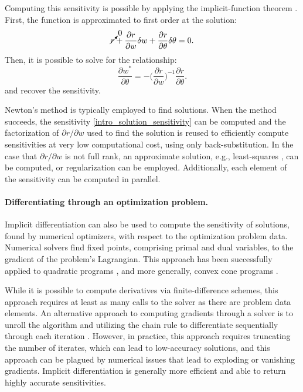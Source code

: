 Computing this sensitivity is possible by applying the implicit-function theorem \cite{dini1907lezioni}. First, the function is approximated to first order at the solution:
\begin{equation}
	\cancelto{0}{r} + \frac{\partial r}{\partial w} \delta w + \frac{\partial r}{\partial \theta} \delta \theta = 0.
\end{equation}
Then, it is possible to solve for the relationship: 
\begin{equation}
	\frac{\partial w^*}{\partial \theta} = -\Big(\frac{\partial r}{\partial w}\Big)^{-1} \frac{\partial r}{\partial \theta}. \label{intro_solution_sensitivity}
\end{equation}
and recover the sensitivity.

Newton's method is typically employed to find solutions. When the method succeeds, the sensitivity \eqref{intro_solution_sensitivity} can be computed and the factorization of $\partial r / \partial w$ used to find the solution is reused to efficiently compute sensitivities at very low computational cost, using only back-substitution. In the case that $\partial r / \partial w$ is not full rank, an approximate solution, e.g., least-squares \cite{boyd2004convex}, can be computed, or regularization can be employed. Additionally, each element of the sensitivity can be computed in parallel.

\paragraph{Differentiating through an optimization problem.}
Implicit differentiation can also be used to compute the sensitivity of solutions, found by numerical optimizers, with respect to the optimization problem data. Numerical solvers find fixed points, comprising primal and dual variables, to the gradient of the problem's Lagrangian. This approach has been successfully applied to quadratic programs \cite{amos2017optnet}, and more generally, convex cone programs \cite{agrawal2019differentiating}.

While it is possible to compute derivatives via finite-difference schemes, this approach requires at least as many calls to the solver as there are problem data elements. An alternative approach to computing gradients through a solver is to unroll the algorithm and utilizing the chain rule to differentiate sequentially through each iteration \cite{domke2012generic}. However, in practice, this approach requires truncating the number of iterates, which can lead to low-accuracy solutions, and this approach can be plagued by numerical issues that lead to exploding or vanishing gradients. Implicit differentiation is generally more efficient and able to return highly accurate sensitivities. 




